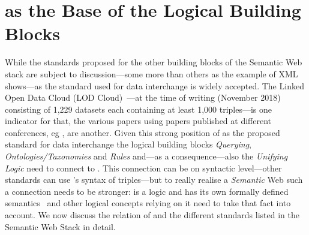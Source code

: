 \section{\rdf as the Base of the Logical Building Blocks}
While the standards proposed for the other building blocks of the Semantic Web stack are subject to discussion---some more than others as the example of XML shows---\rdf as 
the standard 
used for data interchange is widely accepted. The Linked Open Data Cloud (LOD Cloud)~\cite{LODCloud}---at the time of writing (November 2018) 
consisting of 1,229 datasets each containing at least 1,000 \rdf triples---is one indicator for that, the various papers using \rdf papers 
published at different conferences, eg \cite{iswc,eswc},
are another. 
Given this strong position of \rdf as the proposed standard for data interchange 
the logical building blocks \emph{Querying}, \emph{Ontologies/Taxonomies} and \emph{Rules} and---as a consequence---also the
\emph{Unifying Logic} need to connect to \rdf. 
This connection can be on syntactic level---other standards can use \rdf's syntax of triples---but to really realise a \emph{Semantic} Web 
such a connection needs to be stronger:
\rdf is a logic and has its own formally defined semantics~\cite{RDFSemantics} and other logical concepts relying on it need to take that fact into account. 
We now discuss the relation of \rdf and the different standards listed in the Semantic Web Stack in detail.

